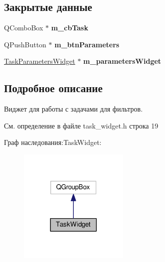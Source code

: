 \subsection*{Закрытые данные}
\begin{DoxyCompactItemize}
\item 
Q\+Combo\+Box $\ast$ {\bfseries m\+\_\+cb\+Task}\hypertarget{class_task_widget_afbdad5a3494264c0edcd3fc2444bb5bb}{}\label{class_task_widget_afbdad5a3494264c0edcd3fc2444bb5bb}

\item 
Q\+Push\+Button $\ast$ {\bfseries m\+\_\+btn\+Parameters}\hypertarget{class_task_widget_a150a4b841480dcce86914f04635812ef}{}\label{class_task_widget_a150a4b841480dcce86914f04635812ef}

\item 
\hyperlink{class_task_parameters_widget}{Task\+Parameters\+Widget} $\ast$ {\bfseries m\+\_\+parameters\+Widget}\hypertarget{class_task_widget_a5feaeeed716a49df8022b6b712c69840}{}\label{class_task_widget_a5feaeeed716a49df8022b6b712c69840}

\end{DoxyCompactItemize}


\subsection{Подробное описание}
Виджет для работы с задачами для фильтров. 

См. определение в файле task\+\_\+widget.\+h строка 19



Граф наследования\+:Task\+Widget\+:
\nopagebreak
\begin{figure}[H]
\begin{center}
\leavevmode
\includegraphics[width=149pt]{class_task_widget__inherit__graph}
\end{center}
\end{figure}


